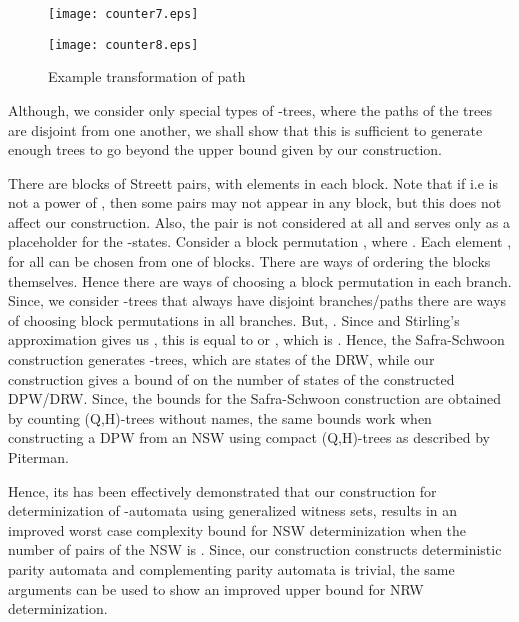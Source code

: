 \documentclass[3p]{elsarticle}
\begin{document}
\begin{figure}[ht]
\begin{minipage}[b]{0.48\linewidth}
\begin{center}
\texttt{[image: counter7.eps]}
\end{center}
\label{counterex7}
\end{minipage}
\hspace{5mm}
\begin{minipage}[b]{0.48\linewidth}
\begin{center}
\texttt{[image: counter8.eps]}
\end{center}
\label{counterex8}
\end{minipage}
\caption{Example transformation of path }
\label{counterex78}
\end{figure}

Although, we consider only special types of -trees, where the paths of
the trees are disjoint from one another, we shall show that this is sufficient
to generate enough trees to go beyond the  upper bound given
by our construction. 

There are  blocks of Streett pairs, with 
elements in each block. Note that if  i.e  is not
a power of , then some pairs may not appear in any block, but this does not
affect our construction. Also, the pair  is not considered at
all and serves only as a placeholder for the -states.  Consider a block
permutation , where .
Each element , for all  can be chosen
from one of  blocks. There are  ways of ordering the blocks themselves.
Hence there are  ways of choosing a block permutation in each
branch. Since, we consider -trees that always have  disjoint
branches/paths there are  ways of choosing block
permutations in all branches. But, . Since  and Stirling's approximation gives us
, this is equal to
 or
, which is . Hence, the
Safra-Schwoon construction generates  -trees, which are
states of the DRW, while our construction gives a bound of  on
the number of states of the constructed DPW/DRW. Since, the bounds for the
Safra-Schwoon construction are obtained by counting (Q,H)-trees without names,
the same bounds work when constructing a DPW from an NSW using compact
(Q,H)-trees as described by Piterman\cite{piterman}.


Hence, its has been effectively demonstrated that our construction for
determinization of -automata using generalized witness sets, results in
an improved worst case complexity bound for NSW determinization when the number
of pairs of the NSW is . Since, our construction constructs deterministic
parity automata and complementing parity automata is trivial, the same arguments
can be used to show an improved upper bound for NRW determinization. 
\end{document}
